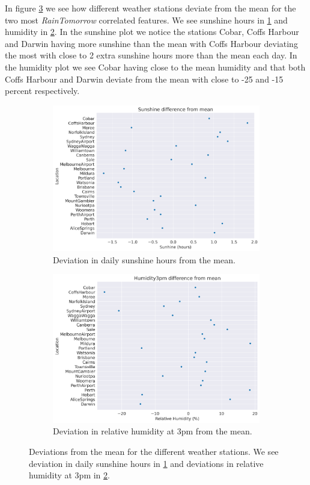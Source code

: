 \documentclass[11pt]{article}
\begin{document}
In figure \ref{fig:features} we see how different weather stations deviate from the mean for the two most \textit{RainTomorrow} correlated features. We see sunshine hours in \ref{fig:sunshine} and humidity in \ref{fig:humidity}. In the sunshine plot we notice the stations Cobar, Coffs Harbour and Darwin having more sunshine than the mean with Coffs Harbour deviating the most with close to 2 extra sunshine hours more than the mean each day. In the humidity plot we see Cobar having close to the mean humidity and that both Coffs Harbour and Darwin deviate from the mean with close to -25 and -15 percent respectively.
\begin{figure}[H]
    \begin{subfigure}{\textwidth}
        \centering
        \includegraphics[width=.8\textwidth]{../figures/Sunshine.png}
        \caption{Deviation in daily sunshine hours from the mean.}
        \label{fig:sunshine}
    \end{subfigure}
    \begin{subfigure}{\textwidth}
        \centering
        \includegraphics[width=.8\textwidth]{../figures/Relative_humidity3pm.png}
        \caption{Deviation in relative humidity at 3pm from the mean.}
        \label{fig:humidity}
    \end{subfigure}
    \caption{Deviations from the mean for the different weather stations. We see deviation in daily sunshine hours in \ref{fig:sunshine} and deviations in relative humidity at 3pm in \ref{fig:humidity}.}
    \label{fig:features}
\end{figure}
\newpage
\end{document}
